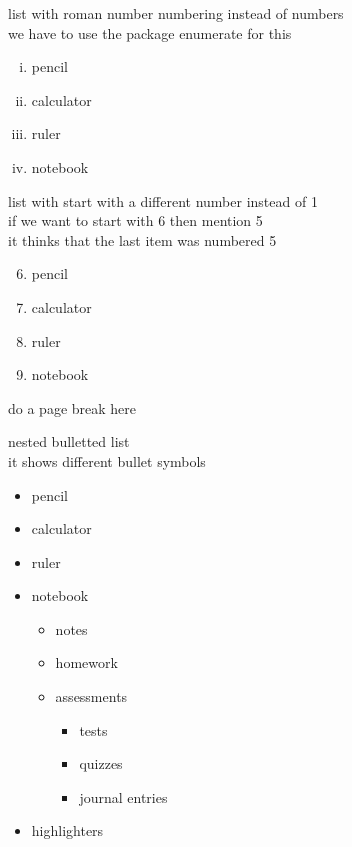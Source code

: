 \documentclass[11pt]{article}
\begin{document}
\vspace{1cm}

list with roman number numbering instead of numbers\\
we have to use the package enumerate for this\\
\begin{enumerate}[i.]
\item pencil
\item calculator
\item ruler
\item notebook
\end{enumerate}


\vspace{1cm}

list with start with a different number instead of 1\\
if we want to start with 6 then mention 5\\
it thinks that the last item was numbered 5\\
\begin{enumerate} \setcounter{enumi}{5}
\item pencil
\item calculator
\item ruler
\item notebook
\end{enumerate}

\vspace{1cm}
do a page break here \\
\pagebreak

nested bulletted list\\
it shows different bullet symbols\\
\begin{itemize}

\item pencil
\item calculator
\item ruler
\item notebook
    \begin{itemize}
    \item notes
    \item homework
    \item assessments
        \begin{itemize}
        \item tests
        \item quizzes
        \item journal entries
        \end{itemize}
    \end{itemize}
\item highlighters
\end{itemize}
\end{document}
